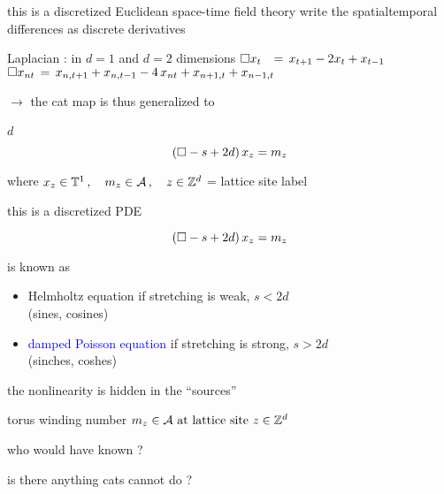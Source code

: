 \begin{frame}{this is a discretized Euclidean space-time field theory}
write the spatialtemporal differences as discrete derivatives
\begin{block}{Laplacian : in $d=1$ and $d=2$ dimensions}
\(
\Box x_t \;\;\,=\, x_{t+1} - 2x_{t} + x_{t-1}
\)\\ \(
\Box x_{nt} \,=\, x_{n,t+1} + x_{n,t-1}
- 4 \, x_{nt} + x_{n+1,t} + x_{n-1, t}
\)
\end{block}

\medskip

$\to$ the cat map is thus generalized  to
\begin{block}{$d$\dmn\ \catlatt}
\[
 (\Box -s+2d)\,x_{z} = m_z
\] %

\medskip

\end{block}

\bigskip
where
\(
  x_{z} \in  \mathbb{T}^{1}
    \,, \quad
  {\ensuremath{m_{z}}} \in \mathcal{A}
    \,, \quad
  z\in \mathbb{Z}^{d}
\) = lattice site label
\end{frame}

\begin{frame}{this is a discretized  PDE}
\begin{block}{\catlatt}
\[
 (\Box -s+2d)\,x_{z} = m_z
\] %

\medskip
\end{block}

\vfill
is known as
\begin{itemize}
\item Helmholtz equation if stretching is weak, $s<2d$ \\ (sines, cosines)
\item \textcolor{blue}{damped Poisson equation} if stretching is strong, $s>2d$ \\ (sinches, coshes)
\end{itemize}
the nonlinearity is hidden in the ``sources''

\medskip
torus winding number
\(
  {m_{z}} \in \mathcal{A}
    \mbox{  at lattice site  }
  z\in \mathbb{Z}^{d}
\)
\end{frame}

\begin{frame}{who would have known ?}
\begin{center}
{\huge is there anything cats cannot do ?}
\end{center}

\vfill
\color{red}{the Ising model of turbulence...}
\end{frame}

